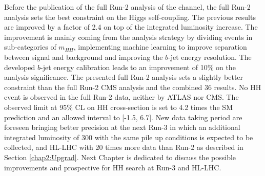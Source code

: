 Before the publication of the full Run-2 analysis of the \bbtt channel, the full Run-2 \HHyybb analysis sets the best constraint on the Higgs self-coupling. The previous results are improved by a factor of 2.4 on top of the integrated luminosity increase. The improvement is mainly coming from the analysis strategy by dividing events in sub-categories of $m_{HH}$, implementing machine learning to improve separation between signal and background and improving the $b$-jet energy resolution. The developed $b$-jet energy calibration leads to an improvement of 10\% on the analysis significance. The presented full Run-2 \HHyybb analysis sets a slightly better constraint than the full Run-2 CMS analysis and the combined 36 \ifb results. No HH event is observed in the full Run-2 data, neither by ATLAS nor CMS. The observed limit at 95\% CL on HH cross-section is set to 4.2 times the SM prediction and an allowed \kl interval to [-1.5, 6.7]. New data taking period are foreseen bringing better precision at the next Run-3 in which an additional integrated luminosity of 300 \ifb with the same pile up conditions is expected to be collected, and HL-LHC with 20 times more data than Run-2 as described in Section \ref{chap2:Upgrad}. Next Chapter is dedicated to discuss the possible improvements and prospective for HH search at Run-3 and HL-LHC. 